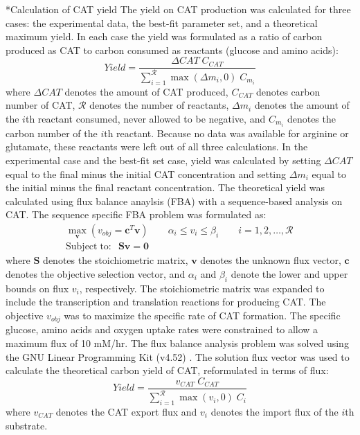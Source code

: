 \documentclass[12pt]{article}
\makeatletter
\renewcommand\subsection{\@startsection
	{subsection}{2}{0mm}
	{-0.05in}
	{-0.5\baselineskip}
	{\normalfont\normalsize\bfseries}}
\makeatother
\begin{document}
\subsection*{Calculation of CAT yield}
The yield on CAT production was calculated for three cases: the experimental data, the best-fit parameter set, and a theoretical maximum yield.
In each case the yield was formulated as a ratio of carbon produced as CAT to carbon consumed as reactants (glucose and amino acids):
\begin{equation}\label{eqn:yield-definition}
	Yield=\frac{\Delta CAT\;C_{CAT}}{\sum_{i=1}^{\mathcal{R}}\max(\Delta m_{i},0)\;C_{m_i}}
\end{equation}
where $\Delta CAT$ denotes the amount of CAT produced, $C_{CAT}$ denotes carbon number of CAT, $\mathcal{R}$ denotes the number of reactants, $\Delta m_{i}$ denotes the amount of the $i$th reactant consumed, never allowed to be negative, and $C_{m_i}$ denotes the carbon number of the $i$th reactant.
Because no data was available for arginine or glutamate, these reactants were left out of all three calculations.
In the experimental case and the best-fit set case, yield was calculated by setting $\Delta CAT$ equal to the final minus the initial CAT concentration and setting $\Delta m_{i}$ equal to the initial minus the final reactant concentration.
The theoretical yield was calculated using flux balance anaylsis (FBA) with a sequence-based analysis on CAT.
The sequence specific FBA \cite{2002_allen_palsson} problem was formulated as:
\begin{equation}\label{eqn:FBA}
\begin{split}
	\max_{\boldsymbol{v}}{} \! \left( v_{obj}=\mathbf{\boldsymbol{c}}^T \boldsymbol{v} \right) \qquad \alpha_i \leq v_i \leq \beta_i  \qquad i=1,2,\hdots,\mathcal{R} \\
	\mathrm{Subject \; to:}	\; \; \mathbf{S}\mathbf{v}=\mathbf{0}\qquad\qquad\qquad\qquad\qquad\qquad\qquad\quad
\end{split}
\end{equation}
where $\mathbf{S}$ denotes the stoichiometric matrix, $\mathbf{v}$ denotes the unknown flux vector, $\boldsymbol{c}$ denotes the objective selection vector, and $\alpha_i$ and $\beta_i$ denote the lower and upper bounds on flux $v_{i}$, respectively.
The stoichiometric matrix was expanded to include the transcription and translation reactions for producing CAT. 
The objective $v_{obj}$ was to maximize the specific rate of CAT formation.
The specific glucose, amino acids and oxygen uptake rates were constrained to allow a maximum flux of 10 mM/hr.
The flux balance analysis problem was solved using the GNU Linear Programming Kit (v4.52) \cite{GLPK}.
The solution flux vector was used to calculate the theoretical carbon yield of CAT, reformulated in terms of flux:
\begin{equation}\label{eqn:yield}
	Yield=\frac{v_{CAT}\;C_{CAT}}{\sum_{i=1}^{\mathcal{R}}\max(v_{i},0)\;C_{i}}
\end{equation}
where $v_{CAT}$ denotes the CAT export flux and $v_{i}$ denotes the import flux of the $i$th substrate.
\end{document}

